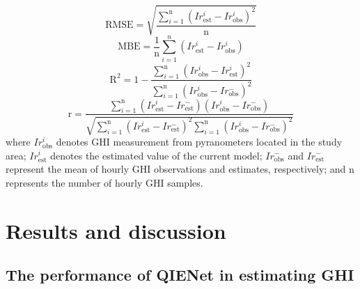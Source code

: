 \documentclass[review]{elsarticle}
\begin{document}
\begin{equation}
    \label{eq:RMSE}
    \mathrm{RMSE}=\sqrt{\frac{\sum_{i=1}^{\mathrm{n}}\left(Ir_{\mathrm{est}}^{i}-Ir_{\mathrm{obs}}^{i}\right)^{2}}{\mathrm{n}}}
\end{equation}
\begin{equation}
    \label{eq:MBE}
    \mathrm{MBE}=\frac{1}{\mathrm{n}}{\sum_{i=1}^{n}\left(Ir_{\mathrm{est}}^{i}-Ir_{\mathrm{obs}}^{i}\right)}
\end{equation}
\begin{equation}
    \label{eq:R2}
    \mathrm{R^{2} }=1-\frac{\sum_{i=1}^{\mathrm{n}}\left(Ir_{\mathrm{obs}}^{i}-Ir_{\mathrm{est}}^{i}\right)^{2} }{\sum_{i=1}^{\mathrm{n}}\left(Ir_{\mathrm{obs}}^{i}-Ir_{\mathrm{obs}}^{-}\right)^{2} }
\end{equation}
\begin{equation}
    \label{eq:r}
    \mathrm{r}=\frac{\sum_{i=1}^{\mathrm{n}}\left(Ir_{\mathrm{est}}^{i}-Ir_{\mathrm{est}}^{-}\right)\left(Ir_{\mathrm{obs}}^{i}-Ir_{\mathrm{obs}}^{-}\right)}{\sqrt{\sum_{i=1}^{\mathrm{n}}\left(Ir_{\mathrm{est}}^{i}-Ir_{\mathrm{est}}^{-}\right)^{2} \sum_{i=1}^{\mathrm{n}}\left(Ir_{\mathrm{obs}}^{i}-Ir_{\mathrm{obs}}^{-}\right)^{2}}}
\end{equation}
where $Ir_{\mathrm {obs }}^{i}$ denotes GHI measurement from pyranometers located in the study area; $Ir_{\mathrm {est }}^{i}$ denotes the estimated value of the current model; $Ir_{\mathrm {obs }}^{-}$ and $Ir_{\mathrm {est }}^{-}$ represent the mean of hourly GHI observations and estimates, respectively; and $\mathrm{n}$ represents the number of hourly GHI samples.


\section{Results and discussion}
\label{section:Results_Discussion}
\subsection{The performance of QIENet in estimating GHI} %
\label{sub:Performance of QIENet}
\end{document}
